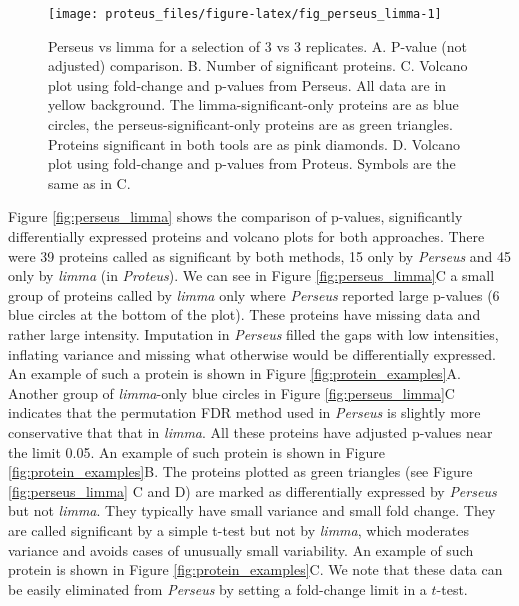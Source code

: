 \documentclass[]{article}
\begin{document}
\begin{figure}[H]

{\centering \texttt{[image: proteus\_files/figure-latex/fig\_perseus\_limma-1]} 

}

\caption{\label{fig:perseus_limma}Perseus vs limma for a selection of 3 vs 3 replicates. A. P-value (not adjusted) comparison. B. Number of significant proteins. C. Volcano plot using fold-change and p-values from Perseus. All data are in yellow background. The limma-significant-only proteins are as blue circles, the perseus-significant-only proteins are as green triangles. Proteins significant in both tools are as pink diamonds. D. Volcano plot using fold-change and p-values from Proteus. Symbols are the same as in C.}\label{fig:fig_perseus_limma}
\end{figure}

Figure \ref{fig:perseus_limma} shows the comparison of p-values,
significantly differentially expressed proteins and volcano plots for
both approaches. There were 39 proteins called as significant by both
methods, 15 only by \emph{Perseus} and 45 only by \emph{limma} (in
\emph{Proteus}). We can see in Figure \ref{fig:perseus_limma}C a small
group of proteins called by \emph{limma} only where \emph{Perseus}
reported large p-values (6 blue circles at the bottom of the plot).
These proteins have missing data and rather large intensity. Imputation
in \emph{Perseus} filled the gaps with low intensities, inflating
variance and missing what otherwise would be differentially expressed.
An example of such a protein is shown in Figure
\ref{fig:protein_examples}A. Another group of \emph{limma}-only blue
circles in Figure \ref{fig:perseus_limma}C indicates that the
permutation FDR method used in \emph{Perseus} is slightly more
conservative that that in \emph{limma}. All these proteins have adjusted
p-values near the limit 0.05. An example of such protein is shown in
Figure \ref{fig:protein_examples}B. The proteins plotted as green
triangles (see Figure \ref{fig:perseus_limma} C and D) are marked as
differentially expressed by \emph{Perseus} but not \emph{limma}. They
typically have small variance and small fold change. They are called
significant by a simple t-test but not by \emph{limma}, which moderates
variance and avoids cases of unusually small variability. An example of
such protein is shown in Figure \ref{fig:protein_examples}C. We note
that these data can be easily eliminated from \emph{Perseus} by setting
a fold-change limit in a \(t\)-test.
\end{document}
